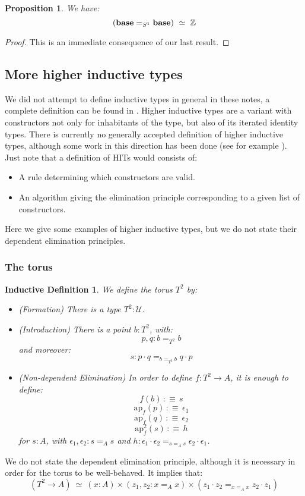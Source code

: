 \documentclass{article}
\newcommand{\sse}[1]{\medbreak \subsection{#1}}
\newcommand{\ssse}[1]{\subsubsection*{#1}}
\newcommand{\U}{{\mathcal U}}
\renewcommand{\r}{\rightarrow}
\newcommand{\ap}{\mathrm{ap}}
\newcommand{\base}{\mathrm{\bf base}}
\newtheorem{proposition}{Proposition}
\newtheorem{ind_def}{Inductive Definition}
\begin{document}
\begin{proposition}
We have: 
\[(\base=_{S^1}\base) \ \simeq \ \mathbb{Z}\]
\end{proposition}
\begin{proof}
This is an immediate consequence of our last result.
\end{proof}


\sse{More higher inductive types}

We did not attempt to define inductive types in general in these notes, a complete definition can be found in \cite{dybjer1994inductive}. Higher inductive types are a variant with constructors not only for inhabitants of the type, but also of its iterated identity types. There is currently no generally accepted definition of higher inductive types, although some work in this direction has been done (see for example \cite{cavallo2019higher}). Just note that a definition of HITs would consists of:
\begin{itemize}
\item A rule determining which constructors are valid.
\item An algorithm giving the elimination principle corresponding to a given list of constructors.
\end{itemize}
Here we give some examples of higher inductive types, but we do not state their dependent elimination principles.


\ssse{The torus}

\begin{ind_def}
We define the torus $T^2$ by:
\begin{itemize}
\item (Formation) There is a type $T^2:\U$.
\item (Introduction) There is a point $b:T^2$, with:
\[p,q:b=_{T^2}b\] 
and moreover: 
\[s:p\cdot q =_{b=_{T^2}b} q\cdot p\]
\item (Non-dependent Elimination) In order to define $f:T^2\r A$, it is enough to define:
\[f(b) \, :\equiv\, s\]
\[\ap_f(p) \, :\equiv\, \epsilon_1 \]
\[\ap_f(q) \, :\equiv\, \epsilon_2\]
\[\ap^2_f(s) \, :\equiv\, h\]
for $s:A$, with $\epsilon_1,\epsilon_2 : s=_As$ and $h:\epsilon_1\cdot\epsilon_2 =_{s=_As}\epsilon_2\cdot\epsilon_1$.
\end{itemize}
\end{ind_def}

We do not state the dependent elimination principle, although it is necessary in order for the torus to be well-behaved. It implies that:
\[(T^2\r A) \ \simeq \ (x:A)\times(z_1,z_2:x=_Ax)\times (z_1\cdot z_2 =_{x=_Ax} z_2\cdot z_1)\]
\end{document}
